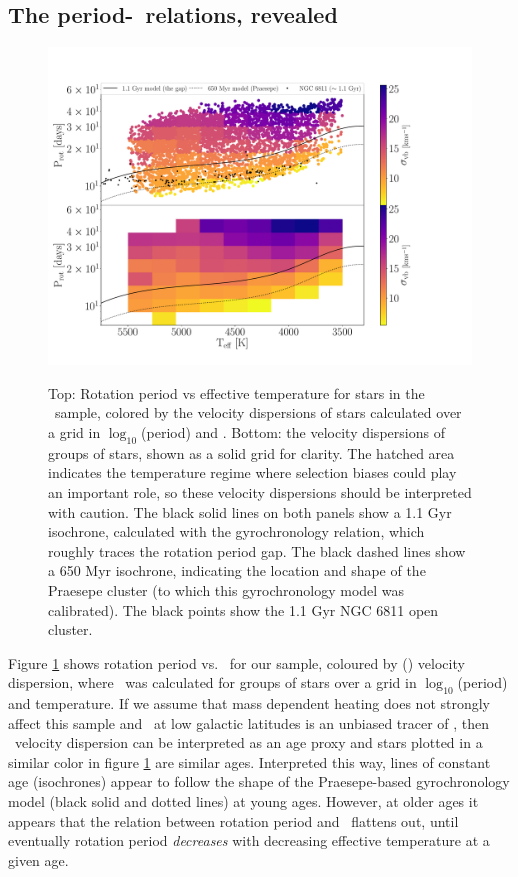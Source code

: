 \subsection{The period-\teff\ relations, revealed}
\label{sec:the_reveal}

\begin{figure}
  \caption{
      Top: Rotation period vs effective temperature for stars in the \mct\
    sample, colored by the velocity dispersions of stars calculated over a
    grid in $\log_{10}$(period) and \teff.
    Bottom: the velocity dispersions of groups of stars, shown as a solid
    grid for clarity.
    The hatched area indicates the temperature regime where selection biases
    could play an important role, so these velocity dispersions should be
    interpreted with caution.
    The black solid lines on both panels show a 1.1 Gyr isochrone, calculated
    with the \citet{angus2019} gyrochronology relation, which roughly traces
    the rotation period gap.
    The black dashed lines show a 650 Myr isochrone, indicating the location
    and shape of the Praesepe cluster (to which this gyrochronology model was
    calibrated).
    The black points show the 1.1 Gyr NGC 6811 open cluster.
}
  \centering
    \includegraphics[width=1\textwidth]{vplot}
\label{fig:dispersion_period_teff}
\end{figure}
Figure \ref{fig:dispersion_period_teff} shows rotation period vs. \teff\ for
our sample, coloured by (\vb) velocity dispersion, where \sigmavb\ was
calculated for groups of stars over a grid in $\log_{10}$(period) and
temperature.
If we assume that mass dependent heating does not strongly affect this sample
and \vb\ at low galactic latitudes is an unbiased tracer of \vz, then \vb\
velocity dispersion can be interpreted as an age proxy and stars plotted in a
similar color in figure \ref{fig:dispersion_period_teff} are similar ages.
Interpreted this way, lines of constant age (isochrones) appear to follow the
shape of the Praesepe-based gyrochronology model (black solid and dotted
lines) at young ages.
However, at older ages it appears that the relation between rotation period
and \teff\ flattens out, until eventually rotation period {\it decreases} with
decreasing effective temperature at a given age.

